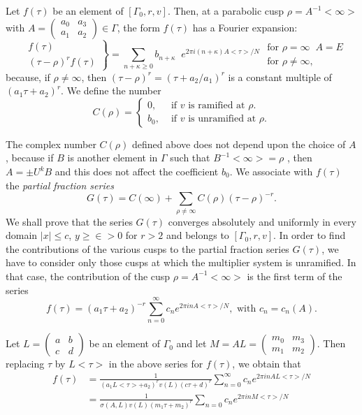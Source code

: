 Let $f(\tau)$ be an element of $[\Gamma_0,r,v]$. Then, at a parabolic
cusp $\rho=A^{-1}<\infty>$ with
$A=\left(\begin{smallmatrix} a_0 & a_3\\a_1 &
  a_2 \end{smallmatrix}\right)\in \Gamma$, the form $f(\tau)$
has a Fourier expansion:
\begin{equation*}
  \left.
    \begin{aligned}
      & f(\tau)\\
      & (\tau -\rho)^r f(\tau)
    \end{aligned}
  \right\}=
  \sum_{n+\kappa \geq 0} b_{n+\kappa} \;\; e^{2\pi i(n+\kappa)A<\tau>/N} 
\begin{array}{l}
\text{ for } \rho = \infty \;\; A = E\\
\text{ for } \rho\neq \infty,
\end{array}
\end{equation*}
because, \pageoriginale if $\rho\neq \infty$, then
$(\tau-\rho)^r=(\tau+a_2/a_1)^r$ is a constant multiple of
$(a_1\tau+a_2)^r$. We define the number
$$
C(\rho) =\begin{cases}
0, & \text{ if $v$ is ramified at $\rho$}.\\
b_0, & \text{ if $v$ is unramified at $\rho$}.
\end{cases}
$$

The complex number $C(\rho)$ defined above does not depend upon the
choice of $A$, because if $B$ is another element in $\Gamma$ such that
$B^{-1}<\infty>=\rho$ , then $A=\pm U^k B$ and this does not affect
the coefficient $b_0$. We associate with $f(\tau)$ the \textit{partial
fraction series}
$$
G(\tau) = C(\infty) + \sum_{\rho\neq \infty} C(\rho) (\tau-\rho)^{-r}. 
$$
We shall prove that the series $G(\tau)$ converges absolutely and
uniformly in every domain $|x|\leq c$, $y\geq \in  >0$ for
$r>2$ and belongs to $[\Gamma_0, r, v]$. In order to find the
contributions of the various cusps to the partial fraction series
$G(\tau)$, we have to consider only those cusps at which the
multiplier system is unramified. In that case, the contribution of the
cusp $\rho = A^{-1}<\infty>$ is the first term of the series 
$$
f(\tau) = (a_1\tau+a_2)^{-r} \sum^{\infty}_{n=0} c_n e^{2\pi i n
  A<\tau>/N}, \text{ with } c_n =c_n(A).
$$

Let $L= \left(\begin{smallmatrix} a&b\\c&d \end{smallmatrix}\right)$
be an element of $\Gamma_0$ and let
$M=AL=\left(\begin{smallmatrix}
  m_0&m_3\\m_1&m_2 \end{smallmatrix}\right)$. Then replacing $\tau$
by $L<\tau>$ in the above series for $f(\tau)$, we obtain that 
\begin{align*}
f(\tau) & =\frac{1}{(a_1L<\tau>+a_2)^rv(L)(c\tau+d)^r}
\sum^{\infty}_{n=0} c_n e^{2\pi i n A L<\tau>/N}\\
& = \frac{1}{\sigma(A,L)v(L)(m_1\tau+m_2)^r} \sum_{n=0} c_n e^{2\pi i
  n M<\tau>/N}
\end{align*}

